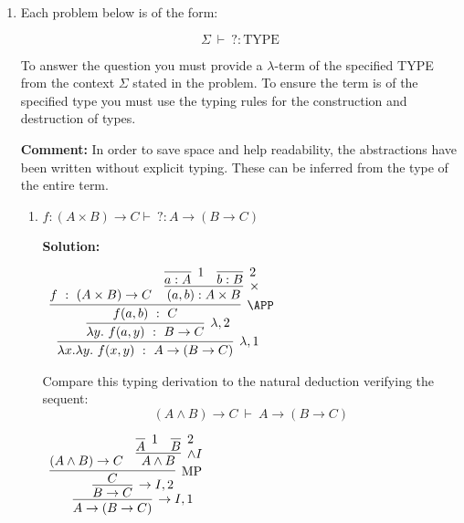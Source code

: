\documentclass[11pt]{report}
\begin{document}
\begin{enumerate}
	\newpage
	\begin{center}
		{\bf Curry-Howard Correspondence}
	\end{center}

	\item Each problem below is of the form: 
	
	$$ \Sigma \ \vdash \ ? : \text{TYPE}$$

	To answer the question you must provide a $\lambda$-term of the specified TYPE from the context $\Sigma$ stated in the problem. To ensure the term is of the specified type you must use the typing rules for the construction and destruction of types. 

	{\bf Comment:} In order to save space and help readability, the abstractions have been written without explicit typing. These can be inferred from the type of the entire term.
	
		\begin{enumerate}
			\item $f : ( A \times  B) \rightarrow  C \vdash \ ? :  A \rightarrow (B \rightarrow  C)$
			
			{\bf Solution:}
			\begin{mdframed}
				\begin{center}
					$\begin{array}{c}
						\infer[\lambda,1]{\lambda x. \lambda y. \ f(x,y) \ : \ A\to(B\to C)}
							{\infer[\lambda,2]{\lambda y. \ f(a,y) \ : \ B\to C}
								{\infer[\APP]{f(a,b) \ : \ C}
									{f \ : \ (A\times B) \to C
									&
									\infer[\times]{(a,b) : A\times B}
										{\infer[1]{a:A}{}
										&
										\infer[2]{b:B}{}}}}}
					\end{array}$
				\end{center}
			\end{mdframed}
			Compare this typing derivation to the natural deduction verifying the sequent: 
			$$(A \land B) \rightarrow C \ \vdash \ A \rightarrow (B \rightarrow  C) $$

			\begin{mdframed}
				\begin{center}
					$\begin{array}{c}
						\infer[\to I,1]{A\to(B\to C)}
							{\infer[\to I,2]{B\to C}
								{\infer[\MP]{C}
									{(A\land B) \to C
									&
									\infer[\land I]{A\land B}
										{\infer[1]{A}{}
										&
										\infer[2]{B}{}}}}}
					\end{array}$
				\end{center}
			\end{mdframed}


\end{enumerate}
\end{enumerate}
\end{document}
